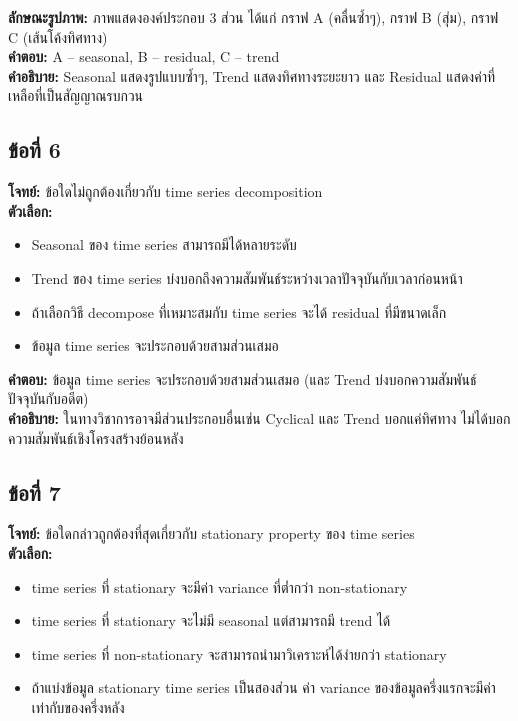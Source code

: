 \documentclass[12pt]{article}
\begin{document}
\textbf{ลักษณะรูปภาพ:} ภาพแสดงองค์ประกอบ 3 ส่วน ได้แก่ กราฟ A (คลื่นซ้ำๆ), กราฟ B (สุ่ม), กราฟ C (เส้นโค้งทิศทาง)\\
\textbf{คำตอบ:} A – seasonal, B – residual, C – trend\\
\textbf{คำอธิบาย:} Seasonal แสดงรูปแบบซ้ำๆ, Trend แสดงทิศทางระยะยาว และ Residual แสดงค่าที่เหลือที่เป็นสัญญาณรบกวน

\subsection*{ข้อที่ 6}
\textbf{โจทย์:} ข้อใดไม่ถูกต้องเกี่ยวกับ time series decomposition\\
\textbf{ตัวเลือก:}
\begin{itemize}
    \item Seasonal ของ time series สามารถมีได้หลายระดับ
    \item Trend ของ time series บ่งบอกถึงความสัมพันธ์ระหว่างเวลาปัจจุบันกับเวลาก่อนหน้า
    \item ถ้าเลือกวิธี decompose ที่เหมาะสมกับ time series จะได้ residual ที่มีขนาดเล็ก
    \item ข้อมูล time series จะประกอบด้วยสามส่วนเสมอ
\end{itemize}

\textbf{คำตอบ:} ข้อมูล time series จะประกอบด้วยสามส่วนเสมอ (และ Trend บ่งบอกความสัมพันธ์ปัจจุบันกับอดีต)\\
\textbf{คำอธิบาย:} ในทางวิชาการอาจมีส่วนประกอบอื่นเช่น Cyclical และ Trend บอกแค่ทิศทาง ไม่ได้บอกความสัมพันธ์เชิงโครงสร้างย้อนหลัง

\subsection*{ข้อที่ 7}
\textbf{โจทย์:} ข้อใดกล่าวถูกต้องที่สุดเกี่ยวกับ stationary property ของ time series\\
\textbf{ตัวเลือก:}
\begin{itemize}
    \item time series ที่ stationary จะมีค่า variance ที่ต่ำกว่า non-stationary
    \item time series ที่ stationary จะไม่มี seasonal แต่สามารถมี trend ได้
    \item time series ที่ non-stationary จะสามารถนำมาวิเคราะห์ได้ง่ายกว่า stationary
    \item ถ้าแบ่งข้อมูล stationary time series เป็นสองส่วน ค่า variance ของข้อมูลครึ่งแรกจะมีค่าเท่ากับของครึ่งหลัง
\end{itemize}
\end{document}
